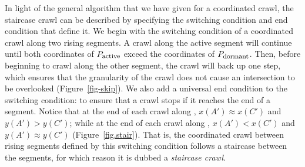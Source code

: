 In light of the general algorithm that we have given for a coordinated crawl,
the staircase crawl can be described by specifying the
switching condition and end condition that define it.
We begin with 
the switching condition of a coordinated crawl along 
two rising segments.
A crawl along the active segment will continue until both coordinates of 
$P_{\mbox{\footnotesize{active}}}$ exceed the coordinates of 
$P_{\mbox{\footnotesize{dormant}}}$.
Then, before beginning to crawl along the other segment, 
the crawl will back up one step, which ensures that the granularity of the crawl
does not cause an intersection to be overlooked (Figure~\ref{fig-skip}).
We also add a universal end condition to the switching condition:
to ensure that a crawl stops if it reaches the end of a segment.
Notice that at the end of each crawl along \arc{AB},
$x(A') \approx x(C')$ and $y(A') > y(C')$;
while at the end of each crawl along \arc{CD},
$x(A')  <  x(C')$ and $y(A') \approx y(C')$ (Figure~\ref{fig.stair}).
That is, the coordinated crawl between rising segments defined by this
switching condition follows a staircase between the segments,
for which reason it is dubbed a {\it staircase crawl}.

